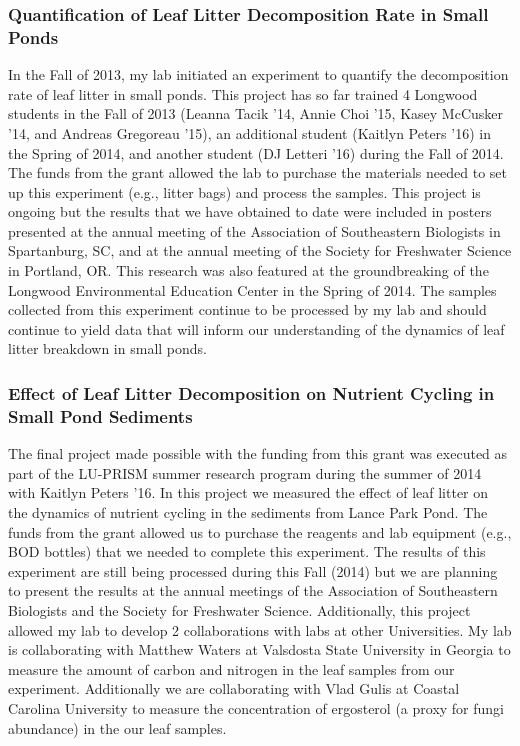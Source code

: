 \documentclass{article}
\begin{document}
\subsubsection{Quantification of Leaf Litter Decomposition Rate in Small Ponds}
In the Fall of 2013, my lab initiated an experiment to quantify the decomposition rate of leaf litter in small ponds. This project has so far trained 4 Longwood students in the Fall of 2013 (Leanna Tacik '14, Annie Choi '15, Kasey McCusker '14, and Andreas Gregoreau '15), an additional student (Kaitlyn Peters '16) in the Spring of 2014, and another student (DJ Letteri '16) during the Fall of 2014. The funds from the grant allowed the lab to purchase the materials needed to set up this experiment (e.g., litter bags) and process the samples. This project is ongoing but the results that we have obtained to date were included in posters presented at the annual meeting of the Association of Southeastern Biologists in Spartanburg, SC, and at the annual meeting of the Society for Freshwater Science in Portland, OR. This research was also featured at the groundbreaking of the Longwood Environmental Education Center in the Spring of 2014. The samples collected from this experiment continue to be processed by my lab and should continue to yield data that will inform our understanding of the dynamics of leaf litter breakdown in small ponds.

\subsubsection{Effect of Leaf Litter Decomposition on Nutrient Cycling in Small Pond Sediments}
The final project made possible with the funding from this grant was executed as part of the LU-PRISM summer research program during the summer of 2014 with Kaitlyn Peters '16. In this project we measured the effect of leaf litter on the dynamics of nutrient cycling in the sediments from Lance Park Pond. The funds from the grant allowed us to purchase the reagents and lab equipment (e.g., BOD bottles) that we needed to complete this experiment. The results of this experiment are still being processed during this Fall (2014) but we are planning to present the results at the annual meetings of the Association of Southeastern Biologists and the Society for Freshwater Science. Additionally, this project allowed my lab to develop 2 collaborations with labs at other Universities. My lab is collaborating with Matthew Waters at Valsdosta State University in Georgia to measure the amount of carbon and nitrogen in the leaf samples from our experiment. Additionally we are collaborating with Vlad Gulis at Coastal Carolina University to measure the concentration of ergosterol (a proxy for fungi abundance) in the our leaf samples. 
\end{document}
